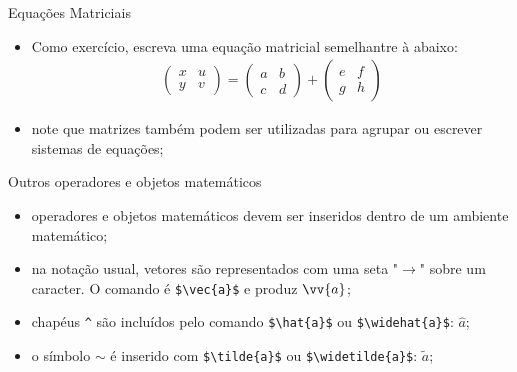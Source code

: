 \documentclass[c]{beamer}
\renewcommand*{\vec}{\vv}%
\begin{document}
{\begin{frame}[fragile]{\sc Equações Matriciais}
\begin{itemize}
    \setlength\itemsep{0.3cm}
\item Como exercício, escreva uma equação matricial semelhantre à abaixo:
\begin{align}
\begin{pmatrix}
 x & u\\
 y & v
\end{pmatrix}
=
\begin{pmatrix}
 a & b \\
 c & d
\end{pmatrix}
+
\begin{pmatrix}
 e & f \\
 g & h 
\end{pmatrix}
\end{align}
\item note que matrizes também podem ser utilizadas para agrupar ou 
escrever sistemas de equações;
\end{itemize}
\end{frame}


\begin{frame}[fragile]{\sc Outros operadores e objetos matemáticos}
\begin{itemize}
    \setlength\itemsep{0.3cm}
    \item operadores e objetos matemáticos devem ser inseridos dentro de um ambiente matemático;
    \item na notação usual, vetores são representados com uma seta "$\to$" sobre um caracter. 
    O comando é \verb|$\vec{a}$| e produz $\vv{a}$; 
    \item chapéus \verb|^| são incluídos pelo comando \verb|$\hat{a}$| ou \verb|$\widehat{a}$|: $\widehat{a}$;
    \item o símbolo $\sim$ é inserido com \verb|$\tilde{a}$| ou \verb|$\widetilde{a}$|: $\widetilde{a}$;
\end{itemize}
\end{frame}


}
\end{document}
